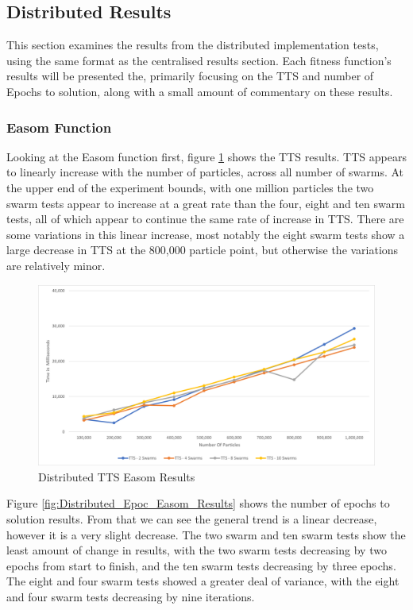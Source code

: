 \documentclass[oneside,12pt]{book}
\begin{document}
\subsection{Distributed Results}
This section examines the results from the distributed implementation tests, using the same format as the centralised results section. Each fitness function's results will be presented the, primarily focusing on the TTS and number of Epochs to solution, along with a small amount of commentary on these results. 

\subsubsection{Easom Function}
Looking at the Easom function first, figure \ref{fig:Distributed_TTS_Easom_Results} shows the TTS results. TTS appears to linearly increase with the number of particles, across all number of swarms. At the upper end of the experiment bounds, with one million particles the two swarm tests appear to increase at a great rate than the four, eight and ten swarm tests, all of which appear to continue the same rate of increase in TTS. There are some variations in this linear increase, most notably the eight swarm tests show a large decrease in TTS at the 800,000 particle point, but otherwise the variations are relatively minor. 

\begin{figure}[H]
    \centering
    \includegraphics[scale=0.45]{Images/Graphs/DistributedEasomTTS.png}
    \caption{Distributed TTS Easom Results}
    \label{fig:Distributed_TTS_Easom_Results}
\end{figure}

Figure \ref{fig:Distributed_Epoc_Easom_Results} shows the number of epochs to solution results. From that we can see the general trend is a linear decrease, however it is a very slight decrease. The two swarm and ten swarm tests show the least amount of change in results, with the two swarm tests decreasing by two epochs from start to finish, and the ten swarm tests decreasing by three epochs. The eight and four swarm tests showed a greater deal of variance, with the eight and four swarm tests decreasing by nine iterations.
\end{document}
